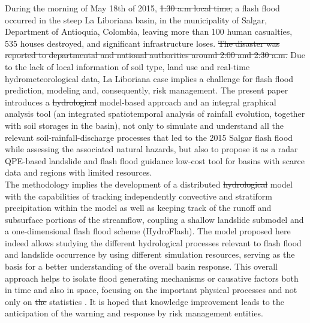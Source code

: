 \documentclass[hess, manuscript]{copernicus} %
\providecommand{\DIFadd}[1]{{\protect\color{blue}\uwave{#1}}} %
\providecommand{\DIFdel}[1]{{\protect\color{red}\sout{#1}}}                      %
\providecommand{\DIFaddbegin}{} %
\providecommand{\DIFaddend}{} %
\providecommand{\DIFdelbegin}{} %
\providecommand{\DIFdelend}{} %
\begin{document}
During the morning of May 18th of 2015,  \DIFdelbegin \DIFdel{1:30 a.m local time,  }\DIFdelend a flash flood occurred in the steep La Liboriana basin, in the municipality of Salgar,  Department of Antioquia, Colombia, leaving more than 100 human casualties, 535 houses destroyed, and significant infrastructure loses.  \DIFdelbegin \DIFdel{The disaster was reported to departmental and national authorities around 2:00 and 2:30 a.m. }\DIFdelend Due to the lack of local information of soil type, land use and real-time hydrometeorological data, La Liboriana case implies a challenge for flash flood prediction, modeling and, consequently, risk management.  The present paper introduces a \DIFdelbegin \DIFdel{hydrological }\DIFdelend \DIFaddbegin \DIFadd{hydrologic }\DIFaddend model-based approach and an integral graphical analysis tool (an integrated spatiotemporal analysis of rainfall evolution, together with soil storages in the basin),  not only to simulate and understand all the relevant soil-rainfall-discharge processes that  led to the 2015 Salgar flash flood while assessing the associated natural hazards, but also to propose it as a radar QPE-based landslide and flash flood guidance low-cost tool for basins with scarce data and regions with limited resources. \\

The methodology implies the development of a distributed \DIFdelbegin \DIFdel{hydrological }\DIFdelend \DIFaddbegin \DIFadd{hydrologic }\DIFaddend model with the capabilities of tracking independently convective and stratiform precipitation within the model as well as keeping track of the runoff and subsurface portions of the streamflow,  coupling a shallow landslide submodel and a one-dimensional flash flood scheme (HydroFlash).  The model proposed here indeed allows studying the different hydrological processes relevant to flash flood and landslide occurrence by using different simulation resources, serving as the basis for a better understanding of the overall basin response. This overall approach helps to isolate flood generating mechanisms or causative factors both in time and also in space, focusing on the important physical processes and not only on \DIFdelbegin \DIFdel{the }\DIFdelend statistics \citep{klemes1993, Merz2003}. It is hoped that knowledge improvement leads to the anticipation of the warning and response by risk management entities. \\
\end{document}
